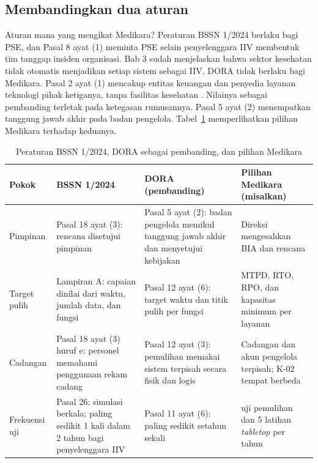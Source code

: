 \subsection*{Membandingkan dua aturan}

Aturan mana yang mengikat Medikara? Peraturan BSSN 1/2024 berlaku bagi PSE, dan Pasal 8 ayat (1)
meminta PSE selain penyelenggara IIV membentuk tim tanggap insiden organisasi. Bab 3 sudah
menjelaskan bahwa sektor kesehatan tidak otomatis menjadikan setiap sistem sebagai IIV. DORA
tidak berlaku bagi Medikara. Pasal 2 ayat (1) mencakup entitas keuangan dan penyedia layanan
teknologi pihak ketiganya, tanpa fasilitas kesehatan \cite{c10-dora}. Nilainya sebagai pembanding
terletak pada ketegasan rumusannya. Pasal 5 ayat (2) menempatkan tanggung jawab akhir pada badan
pengelola. Tabel~\ref{tab:ch10-pembanding} memperlihatkan pilihan Medikara terhadap keduanya.

\begin{table}[!htb]
  \centering\small
  \caption{Peraturan BSSN 1/2024, DORA sebagai pembanding, dan pilihan Medikara}
  \label{tab:ch10-pembanding}
  \begin{tabularx}{\textwidth}{|>{\raggedright\arraybackslash}p{}|>{\raggedright\arraybackslash}X|>{\raggedright\arraybackslash}X|>{\raggedright\arraybackslash}X|}
    \hline
    \textbf{Pokok} & \textbf{BSSN 1/2024} & \textbf{DORA (pembanding)} & \textbf{Pilihan
    Medikara (misalkan)} \\ \hline
    Pimpinan & Pasal 18 ayat (3): rencana disetujui pimpinan & Pasal 5 ayat (2): badan pengelola
    memikul tanggung jawab akhir dan menyetujui kebijakan & Direksi mengesahkan BIA dan rencana
    \\ \hline
    Target pulih & Lampiran A: capaian dinilai dari waktu, jumlah data, dan fungsi & Pasal 12
    ayat (6): target waktu dan titik pulih per fungsi & MTPD, RTO, RPO, dan kapasitas minimum per
    layanan \\ \hline
    Cadangan & Pasal 18 ayat (3) huruf e: personel memahami penggunaan rekam cadang & Pasal 12
    ayat (3): pemulihan memakai sistem terpisah secara fisik dan logis & Cadangan dan akun
    pengelola terpisah; K-02 tempat berbeda \\ \hline
    Frekuensi uji & Pasal 26: simulasi berkala; paling sedikit 1 kali dalam 2 tahun bagi
    penyelenggara IIV & Pasal 11 ayat (6): paling sedikit setahun sekali & 144 uji pemulihan dan
    5 latihan \textit{tabletop} per tahun \\ \hline
  \end{tabularx}
\end{table}

